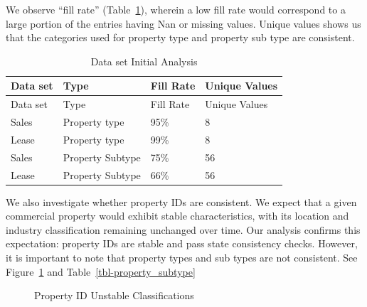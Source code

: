 \documentclass[
  12pt]{article}
\begin{document}
We observe ``fill rate'' (Table~\ref{tbl-one}), wherein a low fill rate
would correspond to a large portion of the entries having Nan or missing
values. Unique values shows us that the categories used for property
type and property sub type are consistent.

\begin{longtable}[]{@{}llll@{}}
\caption{Data set Initial Analysis}\label{tbl-one}\tabularnewline
\toprule\noalign{}
Data set & Type & Fill Rate & Unique Values \\
\midrule\noalign{}
\endfirsthead
\toprule\noalign{}
Data set & Type & Fill Rate & Unique Values \\
\midrule\noalign{}
\endhead
\bottomrule\noalign{}
\endlastfoot
Sales & Property type & 95\% & 8 \\
Lease & Property type & 99\% & 8 \\
Sales & Property Subtype & 75\% & 56 \\
Lease & Property Subtype & 66\% & 56 \\
\end{longtable}

We also investigate whether property IDs are consistent. We expect that
a given commercial property would exhibit stable characteristics, with
its location and industry classification remaining unchanged over time.
Our analysis confirms this expectation: property IDs are stable and pass
state consistency checks. However, it is important to note that property
types and sub types are not consistent. See Figure~\ref{fig-propertyid}
and Table~\ref{tbl-property_subtype}

\begin{figure}


\caption{\label{fig-propertyid}Property ID Unstable Classifications}

\end{figure}%
\end{document}
